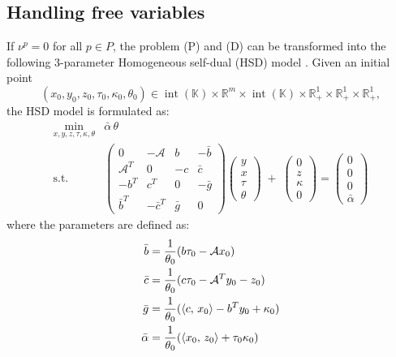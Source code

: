 \subsection{Handling free variables}
If $\nu^p = 0$ for all $p \in P$, the problem (P) and (D) can be transformed into the following 3-parameter Homogeneous self-dual (HSD) model \cite{Wright1997}.
Given an initial point 
\[
(x_0, y_0, z_0, \tau_0, \kappa_0, \theta_0) \in 
  \operatorname{int}(\mathbb{K}) \times \mathbb{R}^m \times \operatorname{int}(\mathbb{K})
  \times \mathbb{R}^1_+ \times \mathbb{R}^1_+ \times \mathbb{R}^1_+,
\]
the HSD model is formulated as:
\[
  \begin{array}{cl}
   \min_{x,y,z,\tau,\kappa,\theta} & \bar{\alpha}\,\theta \\[3pt]
   \text{s.t.}
   & \begin{pmatrix}
       0 & -\mathcal{A} & b & -\bar{b}\\
       \mathcal{A}^T & 0 & -c & \bar{c}\\
       -b^T & c^T & 0 & -\bar{g}\\
       \bar{b}^T & -\bar{c}^T & \bar{g} & 0
     \end{pmatrix}
     \begin{pmatrix} y \\ x \\ \tau \\ \theta \end{pmatrix}
   \;+\;
     \begin{pmatrix} 0 \\ z \\ \kappa \\ 0 \end{pmatrix}
   =
     \begin{pmatrix} 0 \\ 0 \\ 0 \\ \bar{\alpha} \end{pmatrix}
  \end{array}
\]
where the parameters are defined as:
\begin{align*}
    \bar{b} &= \frac{1}{\theta_0}(b\tau_0 - \mathcal{A}x_0) \\
    \bar{c} &= \frac{1}{\theta_0}(c\tau_0 - \mathcal{A}^T y_0 - z_0) \\
    \bar{g} &= \frac{1}{\theta_0}(\left\langle c, \, x_0 \right\rangle - b^Ty_0 + \kappa_0) \\
    \bar{\alpha} &= \frac{1}{\theta_0} (\left\langle x_0, \, z_0 \right\rangle + \tau_0 \kappa_0)
\end{align*}

